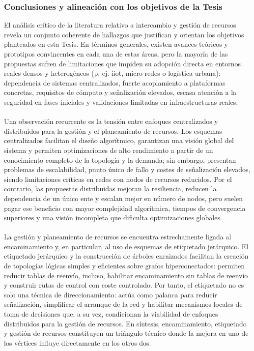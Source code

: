 \subsubsection{Conclusiones y alineación con los objetivos de la Tesis}
\label{subsubsec:conclu_recursos}
El análisis crítico de la literatura relativo a intercambio y gestión de recursos revela un conjunto coherente de hallazgos que justifican y orientan los objetivos planteados en esta Tesis. En términos generales, existen avances teóricos y prototipos convincentes en cada una de estas áreas, pero la mayoría de las propuestas sufren de limitaciones que impiden su adopción directa en entornos reales densos y heterogéneos (p. ej. \gls{iiot}, micro-redes o logística urbana): dependencia de sistemas centralizados, fuerte acoplamiento a plataformas concretas, requisitos de cómputo y señalización elevados, escasa atención a la seguridad en fases iniciales y validaciones limitadas en infraestructuras reales.\\
\\
Una observación recurrente es la tensión entre enfoques centralizados y distribuidos para la gestión y el planeamiento de recursos. Los esquemas centralizados facilitan el diseño algorítmico, garantizan una visión global del sistema y permiten optimizaciones de alto rendimiento a partir de un conocimiento completo de la topología y la demanda; sin embargo, presentan problemas de escalabilidad, punto único de fallo y costes de señalización elevados, siendo limitaciones críticas en redes con nodos de recursos reducidos. Por el contrario, las propuestas distribuidas mejoran la resiliencia, reducen la dependencia de un único ente y escalan mejor en número de nodos, pero suelen pagar ese beneficio con mayor complejidad algorítmica, tiempos de convergencia superiores y una visión incompleta que dificulta optimizaciones globales.\\
\\
La gestión y planeamiento de recursos se encuentra estrechamente ligada al encaminamiento y, en particular, al uso de esquemas de etiquetado jerárquico. El etiquetado jerárquico y la construcción de árboles enraizados facilitan la creación de topologías lógicas simples y eficientes sobre grafos hiperconectados: permiten reducir tablas de reenvío, incluso, habilitar encaminamiento sin tablas de reenvío y construir rutas de control con coste controlado. Por tanto, el etiquetado no es solo una técnica de direccionamiento: actúa como palanca para reducir señalización, simplificar el arranque de la red  y habilitar mecanismos locales de toma de decisiones que, a su vez, condicionan la viabilidad de enfoques distribuidos para la gestión de recursos. En síntesis, encaminamiento, etiquetado y gestión de recursos constituyen un triángulo técnico donde la mejora en uno de los vértices influye directamente en los otros dos.\\
